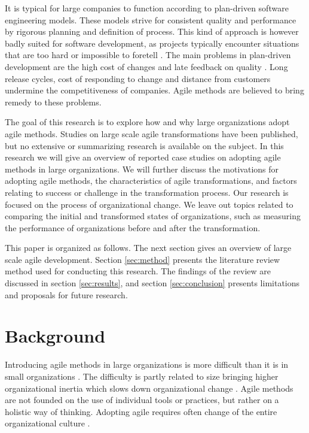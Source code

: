 \documentclass[lnbip]{svmultln}
\begin{document}
It is typical for large companies to function according to plan-driven software
engineering models. These models strive for consistent quality and performance
by rigorous planning and definition of process. This kind of approach is however
badly suited for software development, as projects typically encounter
situations that are too hard or impossible to foretell .
The main problems in plan-driven development are the high cost of changes and
late feedback on quality . Long release cycles, cost of
responding to change and distance from customers undermine the  competitiveness
of companies. Agile methods are believed to bring remedy to these problems.

The goal of this research is to explore how and why large organizations adopt
agile methods. Studies on large scale agile transformations have been published,
but no extensive or summarizing research is available on the subject. In this
research we will give an overview of reported case studies on adopting agile
methods in large organizations. We will further discuss the motivations for
adopting agile methods, the characteristics of agile transformations, and
factors relating to success or challenge in the transformation process. Our
research is focused on the process of organizational change. We leave out topics
related to comparing the initial and transformed states of organizations, such
as measuring the performance of organizations before and after the
transformation.

This paper is organized as follows. The next section gives an overview of large
scale agile development. Section \ref{sec:method} presents the literature review
method used for conducting this research. The findings of the review are
discussed in section \ref{sec:results}, and section \ref{sec:conclusion}
presents limitations and proposals for future research.


\section{Background}
\label{sec:background}

Introducing agile methods in large organizations is more difficult than it is in
small organizations . The difficulty is partly related to size
bringing higher organizational inertia which slows down organizational change
. Agile methods are not founded on the use of individual
tools or practices, but rather on a holistic way of thinking.
Adopting agile requires often change of the entire organizational culture
.
\end{document}

